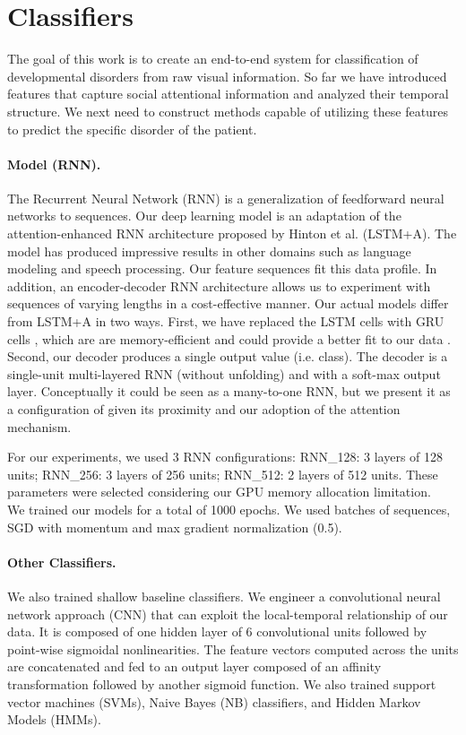 \documentclass{llncs}
\begin{document}
  \section{Classifiers}
  \vspace*{-\baselineskip}
  \label{sec:classification}
  The goal of this work is to create an end-to-end system for classification of developmental disorders from raw visual information. So far we have introduced features that capture social attentional information and analyzed their temporal structure. We next need to construct methods capable of utilizing these features to predict the specific disorder of the patient.
  \vspace*{-\baselineskip}
  \paragraph{Model (RNN).} The Recurrent Neural Network (RNN) is a generalization of feedforward neural networks to sequences. Our deep learning model is an adaptation of the attention-enhanced RNN architecture proposed by Hinton et al. \cite{NIPS2015_5635} (LSTM+A). The model has produced impressive results in other domains such as language modeling and speech processing. Our feature sequences fit this data profile. In addition, an encoder-decoder RNN architecture allows us to experiment with sequences of varying lengths in a cost-effective manner. Our actual models differ from LSTM+A in two ways. First, we have replaced the LSTM cells with GRU cells \cite{Cho}, which are are memory-efficient and could provide a better fit to our data \cite{JozefowiczZS15}. Second, our decoder produces a single output value (i.e. class). The decoder is a single-unit multi-layered RNN (without unfolding) and with a soft-max output layer. Conceptually it could be seen as a many-to-one RNN, but we present it as a configuration of \cite{NIPS2015_5635} given its proximity and our adoption of the attention mechanism.

For our experiments, we used 3 RNN configurations: RNN\_128: 3 layers of 128 units;  RNN\_256: 3 layers of 256 units; RNN\_512: 2 layers of 512  units. These parameters were selected considering our GPU memory allocation limitation.\\
We trained our models for a total of 1000 epochs. We used batches of sequences, SGD with momentum and max gradient normalization (0.5). 
\vspace*{-\baselineskip}
\paragraph{Other Classifiers.} We also trained shallow baseline classifiers. We engineer a convolutional neural network approach (CNN) that can exploit the local-temporal relationship of our data.  It is composed of one hidden layer of 6 convolutional units followed by point-wise sigmoidal nonlinearities. The feature vectors computed across the units are concatenated and fed to an output layer composed of an affinity transformation followed by another sigmoid function. We also trained support vector machines ({SVMs}), Naive Bayes ({NB}) classifiers, and Hidden Markov Models ({HMMs}). 
\vspace*{-\baselineskip}
\end{document}
